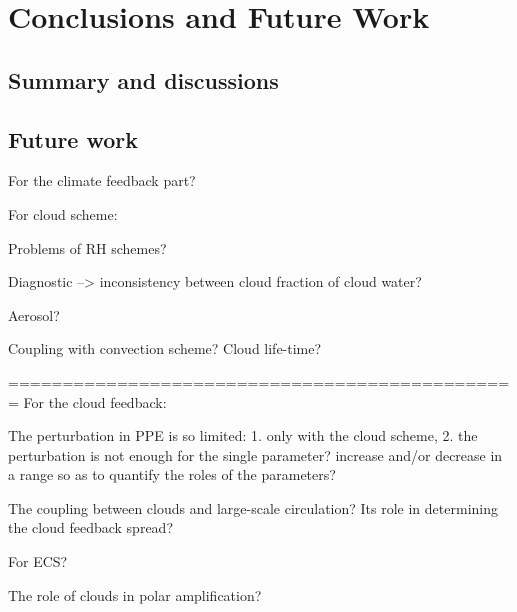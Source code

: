 \chapter{Conclusions and Future Work}
\label{ch:conclusion}

\section{Summary and discussions}

\section{Future work}

For the climate feedback part?

For cloud scheme:

Problems of RH schemes?

Diagnostic --> inconsistency between cloud fraction of cloud water?

Aerosol?

Coupling with convection scheme? Cloud life-time?

===============================================
For the cloud feedback:

The perturbation in PPE is so limited: 1. only with the cloud scheme, 2. the perturbation is not enough for the single parameter? increase and/or decrease in a range so as to quantify the roles of the parameters? 

The coupling between clouds and large-scale circulation? Its role in determining the cloud feedback spread?

For ECS?

The role of clouds in polar amplification?



